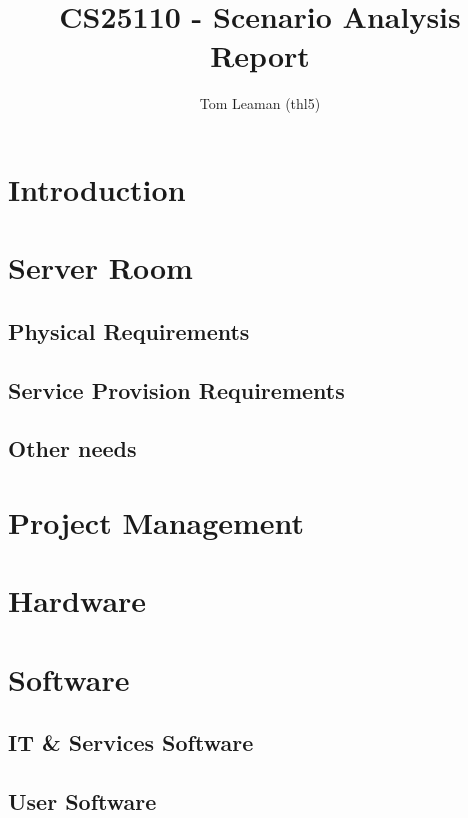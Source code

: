 \documentclass[a4paper, twoside]{article}
\title{CS25110 - Scenario Analysis Report}
\author{Tom Leaman (thl5)}
\begin{document}
\maketitle

\section{Introduction}

\section{Server Room}
\subsection{Physical Requirements}

\subsection{Service Provision Requirements}

\subsection{Other needs}

\section{Project Management}

\section{Hardware}

\section{Software}
\subsection{IT \& Services Software}

\subsection{User Software}
\end{document}

